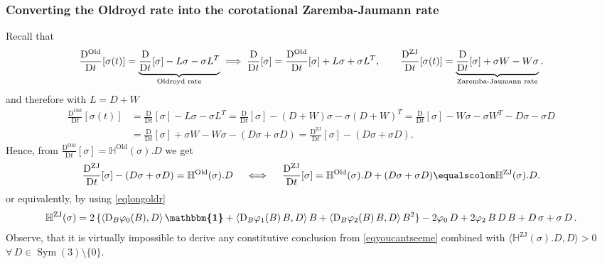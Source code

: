 \documentclass[10pt]{article}
\numberwithin{theoremCounter}{section}
\theoremstyle{plain}
\theoremstyle{definition}
\newcommand{\id}{{\boldsymbol{\mathbbm{1}}}}
\newcommand{\DD}{\mathrm{D}}
\DeclareMathOperator{\Sym}{Sym}
\DeclareMathOperator{\Old}{Old}
\DeclareMathOperator{\ZJ}{ZJ}
\def\H{\mathbb{H}}
\numberwithin{equation}{section}
\begin{document}
\begin{appendix}
\subsubsection{Converting the Oldroyd rate into the corotational Zaremba-Jaumann rate}
%
Recall that
	\begin{equation}
	\frac{\DD^{\Old}}{\DD t}[\sigma(t)] = \underbrace{\frac{\DD}{\DD t}[\sigma] - L\sigma - \sigma L^T}_{\textnormal{Oldroyd rate}} \implies \frac{\DD}{\DD t}[\sigma] = \frac{\DD^{\Old}}{\DD t} [\sigma] + L\sigma + \sigma L^T, \qquad \frac{\DD^{\ZJ}}{\DD t}[\sigma(t)] = \underbrace{\frac{\DD}{\DD t}[\sigma] + \sigma W - W \sigma}_{\textnormal{Zaremba-Jaumann rate}}.
	\end{equation}
and therefore with $L = D + W$
	\begin{equation}
	\begin{alignedat}{2}
	\frac{\DD^{\Old}}{\DD t}[\sigma(t)] &= \frac{\DD}{\DD t}[\sigma] - L\sigma - \sigma L^T = \frac{\DD}{\DD t}[\sigma] - (D+W)\sigma - \sigma(D+W)^T =\frac{\DD}{\DD t}[\sigma] - W\sigma - \sigma W^T - D\sigma - \sigma D \\
	&=\frac{\DD}{\DD t}[\sigma] + \sigma W - W\sigma - (D\sigma + \sigma D) =\frac{\DD^{\ZJ}}{\DD t}[\sigma] - (D\sigma + \sigma D).
	\end{alignedat}
	\end{equation}
Hence, from $\frac{\DD^{\Old}}{\DD t} [\sigma] = \H^{\Old}(\sigma) . D$ we get
	\begin{equation}
	\label{eqZarembaOld}
	\begin{alignedat}{2}
	\frac{\DD^{\ZJ}}{\DD t} [\sigma] - (D\sigma + \sigma D) = \H^{\Old}(\sigma) . D \quad \iff \quad \frac{\DD^{\ZJ}}{\DD t} [\sigma] &= \H^{\Old}(\sigma) . D + (D\sigma + \sigma D) \equalscolon \H^{\ZJ}(\sigma).D .
	\end{alignedat}
	\end{equation}
or equivalently, by using \eqref{eqlongoldr}
	\begin{align}
	\label{eqyoucantseeme}
	\H^{\ZJ}(\sigma) = 2 \, \{\langle \DD_B\varphi_0(B), D \rangle \, \id + \langle \DD_B \varphi_1(B) \, B, D \rangle \, B + \langle \DD_B \varphi_2(B) \, B, D \rangle \, B^2\} - 2 \varphi_0 \, D + 2 \varphi_2 \, B \, D \, B + D \, \sigma + \sigma \, D \, .
	\end{align}
Observe, that it is virtually impossible to derive any constitutive conclusion from \eqref{eqyoucantseeme} combined with $\langle \H^{\ZJ}(\sigma).D, D \rangle > 0$ $\forall \, D \in \Sym(3) \! \setminus \! \{0\}$.


\end{appendix}
\end{document}
